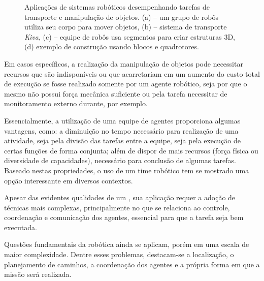 \begin{figure}[htpb]
\begin{subfigure}[t]{0.49\textwidth}
		\caption{\cite{Augugliaro2014}}
		\label{fig:transport_d}
	\end{subfigure}
	\caption[Aplicações de Robôs para Transporte e Manipulação de Objetos]{Aplicações de sistemas robóticos desempenhando tarefas de transporte e manipulação de objetos. (a) -- um grupo de robôs utiliza seu corpo para mover objetos, (b) -- sistema de transporte \emph{Kiva}, (c) -- equipe de robôs usa segmentos para criar estruturas 3D, (d) exemplo de construção usando blocos e quadrotores.}
	\label{fig:transporte_robos}
\end{figure}



Em casos específicos, a realização da manipulação de objetos pode necessitar recursos que são indisponíveis ou que acarretariam em um aumento do custo total de execução se fosse realizado somente por um agente robótico, seja por que o mesmo não possui força mecânica suficiente ou pela tarefa necessitar de monitoramento externo durante, por exemplo.


Essencialmente, a utilização de uma equipe de agentes proporciona algumas vantagens, como: a diminuição no tempo necessário para realização de uma atividade, seja pela divisão das tarefas entre a equipe, seja pela execução de certas funções de forma conjunta; além de dispor de mais recursos (força física ou diversidade de capacidades), necessário para conclusão de algumas tarefas.
Baseado nestas propriedades, o uso de um time robótico tem se mostrado uma opção interessante em diversos contextos.


Apesar das evidentes qualidades de um , sua aplicação requer a adoção de técnicas mais complexas, principalmente no que se relaciona ao controle, coordenação e comunicação dos agentes, essencial para que a tarefa seja bem executada.

Questões fundamentais da robótica ainda se aplicam, porém em uma escala de maior complexidade.
Dentre esses problemas, destacam-se a localização, o planejamento de caminhos, a coordenação dos agentes e a própria forma em que a missão será realizada.

